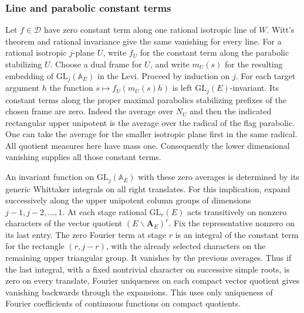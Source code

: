 \subsubsection{Line and parabolic constant terms}
Let \(f\in\mathscr D\) have zero constant term along one rational
isotropic line of \(W\). Witt's theorem and rational invariance
give the same vanishing for every line. For a rational isotropic
\(j\)-plane \(U\), write \(f_U\) for the constant term along the
parabolic stabilizing \(U\). Choose a dual frame for \(U\), and
write \(m_U(s)\) for the resulting embedding of
\(\mathrm{GL}_j(\mathbb A_E)\) in the Levi. Proceed by induction on
\(j\). For each target argument \(h\) the function
\(s\mapsto f_U(m_U(s)h)\) is left \(\mathrm{GL}_j(E)\)-invariant.
Its constant terms along the proper maximal parabolics stabilizing
prefixes of the chosen frame are zero. Indeed the average over
\(N_U\) and then the indicated rectangular upper unipotent is the
average over the radical of the flag parabolic. One can take the
average for the smaller isotropic plane first in the same radical.
All quotient measures here have mass one. Consequently the lower
dimensional vanishing supplies all those constant terms.

An invariant function on \(\mathrm{GL}_j(\mathbb A_E)\) with these
zero averages is determined by its generic Whittaker integrals on
all right translates. For this implication, expand successively along
the upper unipotent column groups of dimensions \(j-1,j-2,\ldots,1\).
At each stage rational \(\mathrm{GL}_r(E)\) acts transitively on
nonzero characters of the vector quotient \((E\backslash\mathbf
A_E)^r\). Fix the representative nonzero on its last entry. The
zero Fourier term at stage \(r\) is an integral of the constant term
for the rectangle \((r,j-r)\), with the already selected characters
on the remaining upper triangular group. It vanishes by the previous
averages. Thus if the last integral, with a fixed nontrivial character
on successive simple roots, is zero on every translate, Fourier
uniqueness on each compact vector quotient gives vanishing backwards
through the expansions. This uses only uniqueness of Fourier
coefficients of continuous functions on compact quotients.


